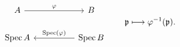 \[
\begin{tikzcd}[column sep=huge]
A \arrow[r,"\varphi"] & B\\
\Spec A & \Spec B \arrow[l,"\Spec(\varphi)"']
\end{tikzcd}
\qquad
\mfp\longmapsto\varphi^{-1}(\mfp).
\]
